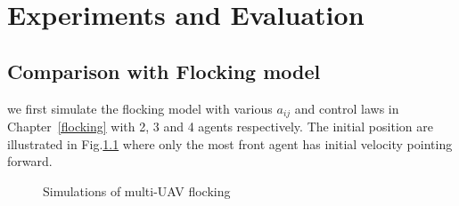 \chapter{Experiments and Evaluation}\label{experiment}

\section{Comparison with Flocking model}

we first simulate the flocking model with various $a_{ij}$ and control laws in Chapter~\ref{flocking} with 2, 3 and 4 agents respectively. The initial position are illustrated in Fig.\ref{fig:simulate_flocking} where only the most front agent has initial velocity pointing forward.
\begin{figure}[htb]
	\centering
	\caption{Simulations of multi-UAV flocking}\label{fig:simulate_flocking}
\end{figure}
